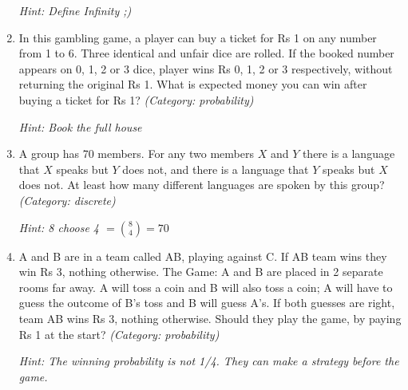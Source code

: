 \begin{enumerate}
\small\emph{Hint: Define Infinity ;)}





\item In this gambling game, a player can buy a ticket for Rs 1 on any number from 1 to 6. Three identical and unfair dice are rolled. If the booked number appears on 0, 1, 2 or 3 dice, player wins Rs 0, 1, 2 or 3 respectively, without returning the original Rs 1. What is expected money you can win after buying a ticket for Rs 1?
\small\emph{(Category: probability)}

\small\emph{Hint: Book the full house}





\item A group has 70 members. For any two members $X$ and $Y$ there is a language that $X$ speaks but $Y$ does not, and there is a language that $Y$ speaks but $X$ does not. At least how many different languages are spoken by this group?
\small\emph{(Category: discrete)}

\small\emph{Hint: 8 choose 4 $= \binom{8}{4}  = 70$}





\item A and B are in a team called AB, playing against C. If AB team wins they win Rs 3, nothing otherwise.
The Game: A and B are placed in 2 separate rooms far away. A will toss a coin and B will also toss a coin; A will have to guess the outcome of B's toss and B will guess A's. If both guesses are right, team AB wins Rs 3, nothing otherwise.
Should they play the game, by paying Rs 1 at the start?
\small\emph{(Category: probability)}

\small\emph{Hint: The winning probability is not 1/4. They can make a strategy before the game.}





\end{enumerate}
